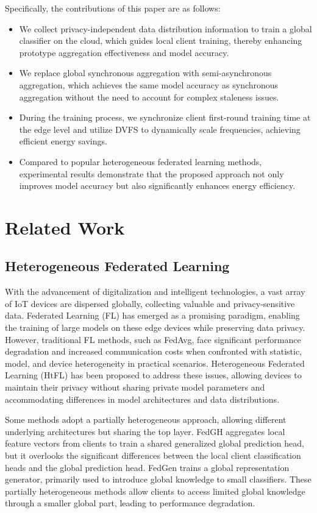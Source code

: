 \documentclass[journal]{IEEEtran}
\begin{document}
Specifically, the contributions of this paper are as follows:
\begin{itemize}
    \item We collect privacy-independent data distribution information to train a global classifier on the cloud, which guides local client training, thereby enhancing prototype aggregation effectiveness and model accuracy.  
    \item We replace global synchronous aggregation with semi-asynchronous aggregation, which achieves the same model accuracy as synchronous aggregation without the need to account for complex staleness issues.  
    \item During the training process, we synchronize client first-round training time at the edge level and utilize DVFS to dynamically scale frequencies, achieving efficient energy savings.  
    \item Compared to popular heterogeneous federated learning methods, experimental results demonstrate that the proposed approach not only improves model accuracy but also significantly enhances energy efficiency.
\end{itemize} 


\section{Related Work}
\subsection{Heterogeneous Federated Learning}
With the advancement of digitalization and intelligent technologies, a vast array of IoT devices are dispersed globally, collecting valuable and privacy-sensitive data. Federated Learning (FL) has emerged as a promising paradigm, enabling the training of large models on these edge devices while preserving data privacy. However, traditional FL methods, such as FedAvg\cite{fedavg_google}, face significant performance degradation and increased communication costs when confronted with statistic, model, and device heterogeneity in practical scenarios. Heterogeneous Federated Learning (HtFL)\cite{tan_fedproto_2021} has been proposed to address these issues, allowing devices to maintain their privacy without sharing private model parameters and accommodating differences in model architectures and data distributions.

Some methods adopt a partially heterogeneous approach, allowing different underlying architectures but sharing the top layer. FedGH\cite{yi_fedgh_2023} aggregates local feature vectors from clients to train a shared generalized global prediction head, but it overlooks the significant differences between the local client classification heads and the global prediction head. FedGen\cite{zhu_data-free_fedgen_2021} trains a global representation generator, primarily used to introduce global knowledge to small classifiers. These partially heterogeneous methods allow clients to access limited global knowledge through a smaller global part, leading to performance degradation.
\end{document}
